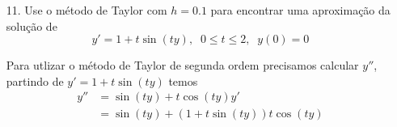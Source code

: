 \documentclass[a4paper, 11pt]{report}
\begin{document}
\begin{enumerate}[leftmargin=*]
\begin{enumerate}[leftmargin=*, label=\alph*.]
    \end{enumerate}

    \item[11.] Use o método de Taylor com $h = 0.1$ para encontrar uma aproximação da solução de
    \[y' = 1 + t \sin (ty), \;\; 0 \leqslant t \leqslant 2, \;\; y(0) = 0\]

    Para utlizar o método de Taylor de segunda ordem precisamos calcular $y''$, partindo de $y' = 1 + t \sin (ty)$ temos
    \begin{align*}
        y'' &= \sin (ty) + t \cos (ty) y'\\
            &= \sin (ty) + (1 + t \sin (ty)) t \cos (ty)
    \end{align*}


\end{enumerate}
\end{document}
